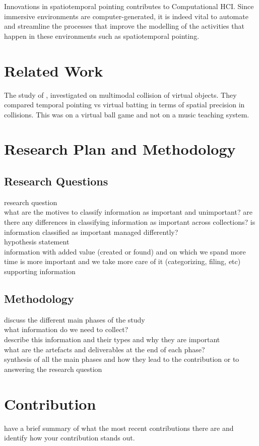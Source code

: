 \documentclass{article}
\begin{document}
Innovations in spatiotemporal pointing contributes to Computational HCI. Since immersive environments are computer-generated, it is indeed vital to automate and streamline the processes that improve the modelling of the activities that happen in these environments such as spatiotemporal pointing. 
\section{Related Work}
The study of \cite{lee2017boxer}, investigated on multimodal collision of virtual objects. They compared temporal pointing vs virtual batting in terms of spatial precision in collisions. This was on a virtual ball game and not on a music teaching system. 
\section{Research Plan and Methodology}
\subsection{Research Questions}
research question\\
what are the motives to classify information as important and unimportant? are there any differences in classifying information as important across collections? is information classified as important managed differently? \\
hypothesis statement\\
information with added value (created or found) and on which we spand more time is more important and we take more care of it (categorizing, filing, etc)\\
supporting information\\
\subsection{Methodology}
discuss the different main phases of the study\\
what information do we need to collect?\\
describe this information and their types and why they are important\\
what are the artefacts and deliverables at the end of each phase?\\
synthesis of all the main phases and how they lead to the contribution or to answering the research question\\
\section{Contribution}
have a brief summary of what the most recent contributions there are and identify how your contribution stands out. 


\end{document}
